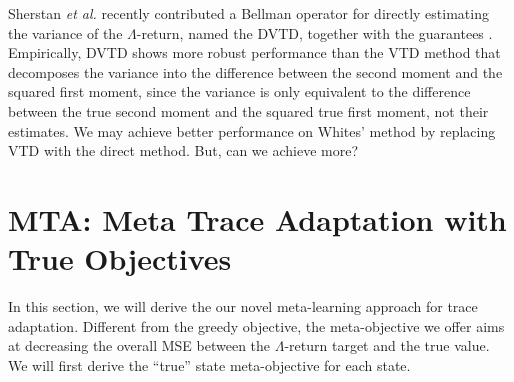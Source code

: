 \documentclass{article}
\newcommand\etal{\textit{et al.}}
\begin{document}




\par
Sherstan \etal{} recently contributed a Bellman operator for directly estimating the variance of the $\Lambda$-return, named the DVTD, together with the guarantees \cite{sherstan2018directly}. Empirically, DVTD shows more robust performance than the VTD method that decomposes the variance into the difference between the second moment and the squared first moment, since the variance is only equivalent to the difference between the true second moment and the squared true first moment, not their estimates. We may achieve better performance on Whites' method by replacing VTD with the direct method. But, can we achieve more?

\section{MTA: Meta Trace Adaptation with True Objectives}\label{sec:MTA}
\par
In this section, we will derive the our novel meta-learning approach for trace adaptation. Different from the greedy objective, the meta-objective we offer aims at decreasing the overall MSE between the $\Lambda$-return target and the true value. We will first derive the ``true'' state meta-objective for each state.
\end{document}
